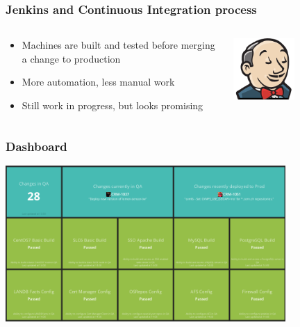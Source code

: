 \documentclass[aspectratio=169]{beamer}
\begin{document}
\begin{frame}
    \frametitle{Jenkins and Continuous Integration process}
    \begin{minipage}[T]{0.95\textwidth}
        \begin{columns}
            \begin{column}{0.5\textwidth}
                \begin{itemize}
                    \item Machines are built and tested before merging a
                        change to production
                    \item More automation, less manual work
                    \item Still work in progress, but looks promising
                \end{itemize}
            \end{column}
            \begin{column}{0.5\textwidth}
                \begin{center}
                    \includegraphics[width=0.5\textwidth]{Jenkins_headshot.png}
                \end{center}
            \end{column}
        \end{columns}
    \end{minipage}
\end{frame}


\begin{frame}
    \frametitle{Dashboard}
        \begin{center}
            \includegraphics[width=0.8\textwidth]{CI-dashboard.png}
        \end{center}
\end{frame}
\end{document}
